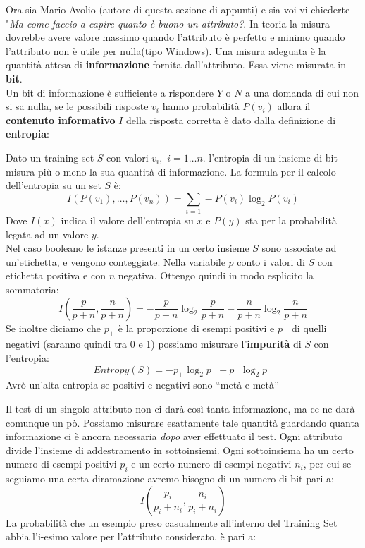 Ora sia Mario Avolio (autore di questa sezione di appunti) e sia voi vi chiederte "\textit{Ma come faccio a capire quanto è buono un attributo?}. In teoria la misura dovrebbe avere valore massimo quando l'attributo è perfetto e minimo quando l'attributo non è utile per nulla(tipo Windows). Una misura adeguata è la quantità attesa di \textbf{informazione} fornita dall'attributo. Essa viene misurata in \textbf{bit}. \\ Un bit di informazione è sufficiente a rispondere $Y$ o $N$ a una domanda di cui non si sa nulla, se le possibili risposte $v_i$ hanno probabilità $P(v_i)$ allora il \textbf{contenuto informativo} $I$ della risposta corretta è dato dalla definizione di \textbf{entropia}:
\begin{definizione}
  Dato un training set $S$ con valori $v_i,\,\,i=1\ldots n$. l'entropia di un
  insieme di bit misura più o meno la sua quantità di informazione. La formula per il calcolo dell'entropia su un set $S$ è:
  \[I(P(v_1),\ldots,P(v_n))=\sum_{i=1}-P(v_i)\log_2P(v_i)\]
  Dove $I(x)$ indica il valore dell'entropia su $x$ e $P(y)$ sta per la
  probabilità legata ad un valore $y$.  \\
  Nel caso booleano le istanze presenti in un certo insieme $S$ sono associate
  ad un'etichetta, e vengono conteggiate. Nella variabile $p$ conto i valori di $S$ con
  etichetta positiva e con $n$ negativa. Ottengo
  quindi in modo esplicito la sommatoria:
  \[I\left(\frac{p}{p+n},\frac{n}{p+n}\right)=-\frac{p}{p+n}\log_2\frac{p}{p+n}
    -\frac{n}{p+n}\log_2\frac{n}{p+n}\]  
  Se inoltre diciamo che $p_+$ è la proporzione di esempi positivi e $p_-$ di
  quelli negativi (saranno quindi tra 0 e 1) possiamo misurare
  l'\textbf{impurità} di $S$ con l'entropia: 
  \[Entropy(S)=-p_+\log_2 p_+-p_-\log_2 p_-\]
  Avrò un'alta entropia se positivi e negativi sono ``metà e metà''
\end{definizione}
Il test di un singolo attributo non ci darà così tanta informazione, ma ce ne darà comunque un pò. Possiamo misurare esattamente tale quantità guardando quanta informazione ci è ancora necessaria \textit{dopo} aver effettuato il test. Ogni attributo divide l'insieme di addestramento in sottoinsiemi. Ogni sottoinsiema ha un certo numero di esempi positivi $p_i$ e un certo numero di esempi negativi $n_i$, per cui se seguiamo una certa diramazione avremo bisogno di un numero di bit pari a:
\[I\left(\frac{p_i}{p_i+n_i},\frac{n_i}{p_i+n_i}\right)\]
La probabilità che un esempio preso casualmente all'interno del Training Set abbia l'i-esimo valore per l'attributo considerato, è pari a:
